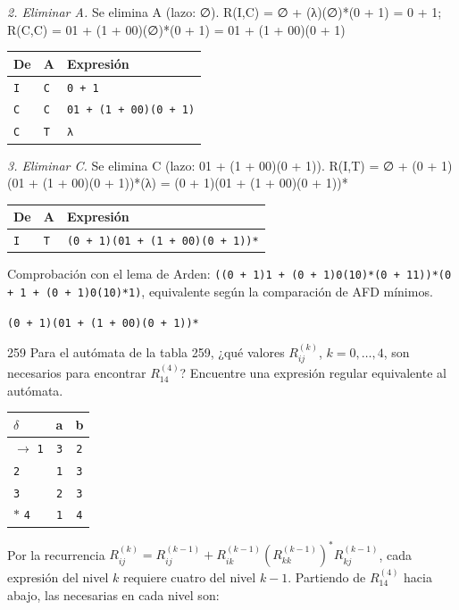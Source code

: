 \documentclass[11pt]{article}
\begin{document}
\textit{2. Eliminar A.} Se elimina A (lazo: ∅). R(I,C) = ∅ + (λ)(∅)*(0 + 1) = 0 + 1; R(C,C) = 01 + (1 + 00)(∅)*(0 + 1) = 01 + (1 + 00)(0 + 1)
\begin{center}\footnotesize\begin{tabular}{lll}\toprule
De & A & Expresión \\\midrule
\texttt{I} & \texttt{C} & \texttt{0 + 1} \\
\texttt{C} & \texttt{C} & \texttt{01 + (1 + 00)(0 + 1)} \\
\texttt{C} & \texttt{T} & \texttt{λ} \\
\bottomrule\end{tabular}\end{center}
\textit{3. Eliminar C.} Se elimina C (lazo: 01 + (1 + 00)(0 + 1)). R(I,T) = ∅ + (0 + 1)(01 + (1 + 00)(0 + 1))*(λ) = (0 + 1)(01 + (1 + 00)(0 + 1))*
\begin{center}\footnotesize\begin{tabular}{lll}\toprule
De & A & Expresión \\\midrule
\texttt{I} & \texttt{T} & \texttt{(0 + 1)(01 + (1 + 00)(0 + 1))*} \\
\bottomrule\end{tabular}\end{center}
Comprobación con el lema de Arden: \texttt{((0 + 1)1 + (0 + 1)0(10)*(0 + 11))*(0 + 1 + (0 + 1)0(10)*1)}, equivalente según la comparación de AFD mínimos.

\resp \texttt{(0 + 1)(01 + (1 + 00)(0 + 1))*}


\begin{ejercicio}{259}{}
Para el autómata de la tabla 259, ¿qué valores $R_{ij}^{(k)}$, $k = 0, \ldots, 4$, son necesarios para encontrar $R_{14}^{(4)}$? Encuentre una expresión regular equivalente al autómata.
\end{ejercicio}
\proc \begin{center}\small\begin{tabular}{lcc}\toprule
$\delta$ & a & b \\\midrule
$\to$ \texttt{1} & \texttt{3} & \texttt{2} \\
 \texttt{2} & \texttt{1} & \texttt{3} \\
 \texttt{3} & \texttt{2} & \texttt{3} \\
$*$ \texttt{4} & \texttt{1} & \texttt{4} \\
\bottomrule\end{tabular}\end{center}
Por la recurrencia $R_{ij}^{(k)} = R_{ij}^{(k-1)} + R_{ik}^{(k-1)}(R_{kk}^{(k-1)})^*R_{kj}^{(k-1)}$, cada expresión del nivel $k$ requiere cuatro del nivel $k-1$. Partiendo de $R_{14}^{(4)}$ hacia abajo, las necesarias en cada nivel son:
\end{document}
